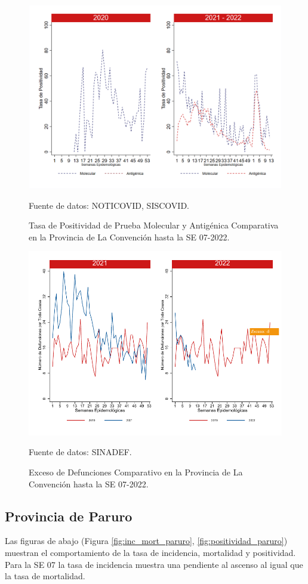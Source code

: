 \documentclass[12pt,a4paper,openany]{book}
\begin{document}
		\begin{figure}[h]
			\caption{Tasa de Positividad de Prueba Molecular y Antigénica Comparativa en la Provincia de La Convención hasta la SE 07-2022.}\label{fig:positividad_laconv}
			\begin{center}
				\includegraphics[width=0.7\linewidth]{../figuras/positividad_20_21_9.png}
			\end{center}
			{\footnotesize {Fuente de datos: NOTICOVID, SISCOVID.}}
		\end{figure}
		
		\begin{figure}[h]
			\caption{Exceso de Defunciones Comparativo en la Provincia de La Convención hasta la SE 07-2022.}\label{fig:exceso_laconv}
			\begin{center}
				\includegraphics[width=0.7\linewidth]{../figuras/exceso_9.pdf}
			\end{center}
			{\footnotesize {Fuente de datos: SINADEF.}}
		\end{figure}
		
		\clearpage
		
		\subsection*{Provincia de Paruro}
		\noindent Las figuras de abajo (Figura \ref{fig:inc_mort_paruro}, \ref{fig:positividad_paruro}) muestran el comportamiento de la tasa de incidencia, mortalidad y positividad. Para la SE 07 la tasa de incidencia muestra una pendiente al ascenso al igual que la tasa de mortalidad.
	 
\end{document}

